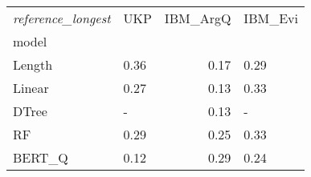 \begin{tabular}{llrl}
\toprule
\textit{reference\_longest} &   UKP &  IBM\_ArgQ & IBM\_Evi \\
model  &       &           &         \\
\midrule
Length &  0.36 &      0.17 &    0.29 \\
Linear &  0.27 &      0.13 &    0.33 \\
DTree  &     - &      0.13 &       - \\
RF     &  0.29 &      0.25 &    0.33 \\
BERT\_Q &  0.12 &      0.29 &    0.24 \\
\bottomrule
\end{tabular}
